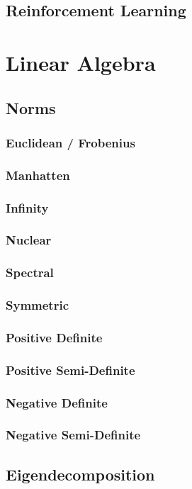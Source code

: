 \documentclass[11pt]{article}
\begin{document}
\subsection{Reinforcement Learning}

\section{Linear Algebra}
\subsection{Norms}
\subsubsection{Euclidean / Frobenius}
\subsubsection{Manhatten}
\subsubsection{Infinity}
\subsubsection{Nuclear}
\subsubsection{Spectral}
\subsubsection{Symmetric}
\subsubsection{Positive Definite}
\subsubsection{Positive Semi-Definite}
\subsubsection{Negative Definite}
\subsubsection{Negative Semi-Definite}
\subsection{Eigendecomposition}
\end{document}
